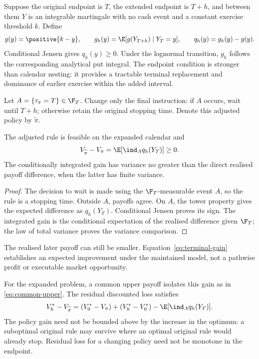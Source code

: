 Suppose the original endpoint is $T$, the extended endpoint is $T+h$, and between them $Y$ is an integrable martingale with no cash event and a constant exercise threshold $k$. Define
\begin{equation}
 g(y)=\positive{k-y},\qquad
 g_h(y)=\E[g(Y_{T+h})\mid Y_T=y],\qquad
 q_h(y)=g_h(y)-g(y).
\label{eq:wait}
\end{equation}
Conditional Jensen gives $q_h(y)\geq0$. Under the lognormal transition, $g_h$ follows the corresponding analytical put integral. The endpoint condition is stronger than calendar nesting: it provides a tractable terminal replacement and dominance of earlier exercise within the added interval.

Let $A=\{\tau_\pi=T\}\in\F_T$. Change only the final instruction: if $A$ occurs, wait until $T+h$; otherwise retain the original stopping time. Denote this adjusted policy by $\widetilde\pi$.

\begin{proposition}
The adjusted rule is feasible on the expanded calendar and
\begin{equation}
 V_{\widetilde\pi}-V_\pi=\E[\ind_Aq_h(Y_T)]\geq0.
\label{eq:terminal-gain}
\end{equation}
The conditionally integrated gain has variance no greater than the direct realised payoff difference, when the latter has finite variance.
\end{proposition}
\begin{proof}
The decision to wait is made using the $\F_T$-measurable event $A$, so the rule is a stopping time. Outside $A$, payoffs agree. On $A$, the tower property gives the expected difference as $q_h(Y_T)$. Conditional Jensen proves its sign. The integrated gain is the conditional expectation of the realised difference given $\F_T$; the law of total variance proves the variance comparison.
\end{proof}

The realised later payoff can still be smaller. Equation~\eqref{eq:terminal-gain} establishes an expected improvement under the maintained model, not a pathwise profit or executable market opportunity.

For the expanded problem, a common upper payoff isolates this gain as in \eqref{eq:common-upper}. The residual discounted loss satisfies
\begin{equation}
 V_h^*-V_{\widetilde\pi}
 =(V_0^*-V_\pi)+(V_h^*-V_0^*)-\E[\ind_Aq_h(Y_T)].
\label{eq:remaining}
\end{equation}
The policy gain need not be bounded above by the increase in the optimum: a suboptimal original rule may survive where an optimal original rule would already stop. Residual loss for a changing policy need not be monotone in the endpoint.

